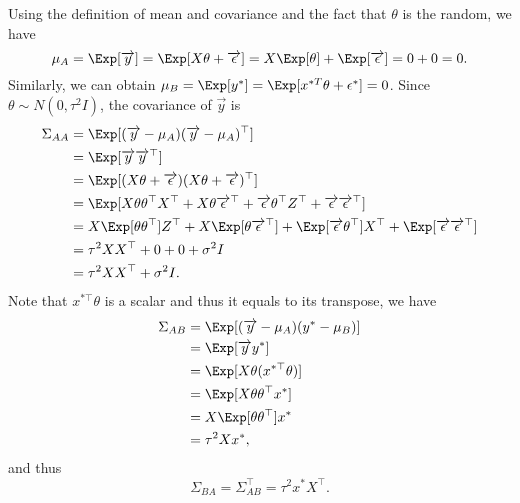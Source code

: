 Using the definition of mean and covariance and the fact that $\theta$ is the random, we have
\begin{equation*} \label{eu_eqn}
	\mu_A = \Exp [\overrightarrow{y}] = \Exp [X\theta + \overrightarrow{\epsilon}] = X \Exp [\theta] + \Exp [\overrightarrow{\epsilon}] = 0 + 0 = 0.
\end{equation*}
Similarly, we can obtain $\mu_B = \Exp [y^*] = \Exp [x^{*T} \theta + \epsilon^*] = 0$. Since $\theta \sim N(0, \tau^2 I)$, the covariance of $\overrightarrow{y}$ is
\begin{equation*} \label{eq1}
	\begin{split}
		\Sigma_{AA} & = \Exp [(\overrightarrow{y} - \mu_A)(\overrightarrow{y} - \mu_A)^\top] \\
		& = \Exp[\overrightarrow{y} \overrightarrow{y}^\top] \\
		& = \Exp[(X\theta + \overrightarrow{\epsilon})(X\theta + \overrightarrow{\epsilon})^\top] \\
		& = \Exp[X\theta\theta^\top X^\top + X\theta \overrightarrow{\epsilon}^\top + \overrightarrow{\epsilon} \theta^\top Z^\top + \overrightarrow{\epsilon} \overrightarrow{\epsilon}^\top] \\
		& = X \Exp[\theta \theta^\top]Z^\top + X\Exp[\theta \overrightarrow{\epsilon}^\top] + \Exp[\overrightarrow{\epsilon}\theta^\top]X^\top + \Exp[\overrightarrow{\epsilon}\overrightarrow{\epsilon}^\top] \\
		& = \tau^2 XX^\top + 0 + 0 + \sigma^2 I \\
		& = \tau^2 XX^\top + \sigma^2 I.
	\end{split}
\end{equation*}
Note that $x^{*\top} \theta$ is a scalar and thus it equals to its transpose, we have 
\begin{equation*} \label{eq1}
	\begin{split}
		\Sigma_{AB} & = \Exp[(\overrightarrow{y} - \mu_A)(y^* - \mu_B)]\\
		& = \Exp[\overrightarrow{y} y^*]\\
		& = \Exp[X\theta (x^{*\top} \theta)]\\
		& = \Exp[X\theta\theta^\top x^*]\\
		& = X \Exp[\theta \theta^\top] x^*\\
		& = \tau^2 X x^*,
	\end{split}
\end{equation*}
and thus
\begin{equation*} \label{eu_eqn}
	\Sigma_{BA} = \Sigma_{AB}^\top = \tau^2 x^* X^\top.
\end{equation*}
